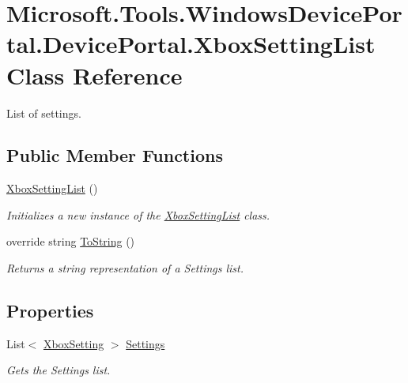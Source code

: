 \hypertarget{class_microsoft_1_1_tools_1_1_windows_device_portal_1_1_device_portal_1_1_xbox_setting_list}{}\section{Microsoft.\+Tools.\+Windows\+Device\+Portal.\+Device\+Portal.\+Xbox\+Setting\+List Class Reference}
\label{class_microsoft_1_1_tools_1_1_windows_device_portal_1_1_device_portal_1_1_xbox_setting_list}


List of settings.  


\subsection*{Public Member Functions}
\begin{DoxyCompactItemize}
\item 
\hyperlink{class_microsoft_1_1_tools_1_1_windows_device_portal_1_1_device_portal_1_1_xbox_setting_list_aa58f636d4bb0e99feb081c51790e8c4e}{Xbox\+Setting\+List} ()
\begin{DoxyCompactList}\small\item\em Initializes a new instance of the \hyperlink{class_microsoft_1_1_tools_1_1_windows_device_portal_1_1_device_portal_1_1_xbox_setting_list}{Xbox\+Setting\+List} class. \end{DoxyCompactList}\item 
override string \hyperlink{class_microsoft_1_1_tools_1_1_windows_device_portal_1_1_device_portal_1_1_xbox_setting_list_aea824c0d59a64f6a516e593fe381e218}{To\+String} ()
\begin{DoxyCompactList}\small\item\em Returns a string representation of a Settings list. \end{DoxyCompactList}\end{DoxyCompactItemize}
\subsection*{Properties}
\begin{DoxyCompactItemize}
\item 
List$<$ \hyperlink{class_microsoft_1_1_tools_1_1_windows_device_portal_1_1_device_portal_1_1_xbox_setting}{Xbox\+Setting} $>$ \hyperlink{class_microsoft_1_1_tools_1_1_windows_device_portal_1_1_device_portal_1_1_xbox_setting_list_a6b30f716a804f46a2b48f0a4653bc5ad}{Settings}
\begin{DoxyCompactList}\small\item\em Gets the Settings list. \end{DoxyCompactList}\end{DoxyCompactItemize}


